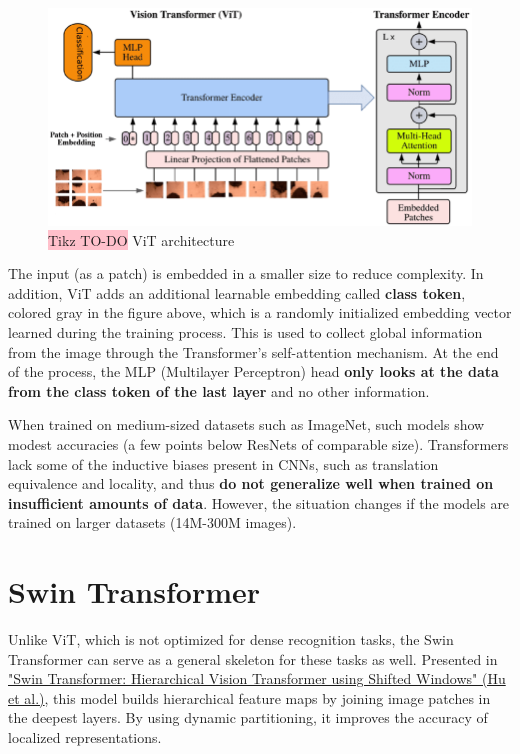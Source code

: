 \begin{figure}[H]
    \centering
    \includegraphics[width=\linewidth]{tikz/chapter8 - Vision Transformer.png}
    \caption{{\color{red}\colorbox{pink}{Tikz TO-DO}} ViT architecture}
\end{figure}

The input (as a patch) is embedded in a smaller size to reduce complexity. In addition, ViT adds an additional learnable embedding called \textbf{class token}, colored gray in the figure above, which is a randomly initialized embedding vector learned during the training process. This is used to collect global information from the image through the Transformer's self-attention mechanism. At the end of the process, the MLP (Multilayer Perceptron) head \textbf{only looks at the data from the class token of the last layer} and no other information.

When trained on medium-sized datasets such as ImageNet, such models show modest accuracies (a few points below ResNets of comparable size). Transformers lack some of the inductive biases present in CNNs, such as translation equivalence and locality, and thus \textbf{do not generalize well when trained on insufficient amounts of data}. However, the situation changes if the models are trained on larger datasets (14M-300M images).

\section{Swin Transformer}

Unlike ViT, which is not optimized for dense recognition tasks, the Swin Transformer can serve as a general skeleton for these tasks as well. Presented in \href{https://arxiv.org/pdf/2103.14030}{"Swin Transformer: Hierarchical Vision Transformer using Shifted Windows" (Hu et al.)}, this model builds hierarchical feature maps by joining image patches in the deepest layers. By using dynamic partitioning, it improves the accuracy of localized representations. 

